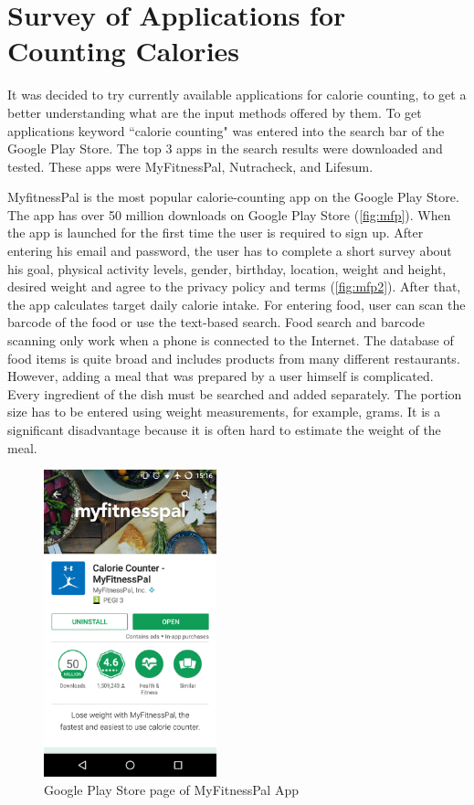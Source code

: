 \section{Survey of Applications for Counting Calories}

 It was decided to try currently available applications for calorie counting, to get a better understanding what are the input methods offered by them. To get applications keyword ``calorie counting" was entered into the search bar of the Google Play Store. The top 3 apps in the search results were downloaded and tested. These apps were MyFitnessPal, Nutracheck, and Lifesum.

MyfitnessPal is the most popular calorie-counting app on the Google Play Store. The app has over 50 million downloads on Google Play Store (\autoref{fig:mfp}). When the app is launched for the first time the user is required to sign up. After entering his email and password, the user has to complete a short survey about his goal, physical activity levels, gender, birthday, location, weight and height, desired weight and agree to the privacy policy and terms (\autoref{fig:mfp2}). After that, the app calculates target daily calorie intake. For entering food, user can scan the barcode of the food or use the text-based search. Food search and barcode scanning only work when a phone is connected to the Internet.  The database of food items is quite broad and includes products from many different restaurants. However,  adding a meal that was prepared by a user himself is complicated. Every ingredient of the dish must be searched and added separately.  The portion size has to be entered using weight measurements, for example,  grams. It is a significant disadvantage because it is often hard to estimate the weight of the meal.
 
\begin{figure}[ht]
\centering
\includegraphics[width=5cm,scale=0.5]{Figures/2/mfp1.png}
\caption{Google Play Store page of MyFitnessPal App}
\label{fig:mfp}
\end{figure}

